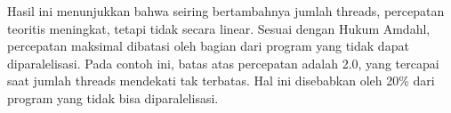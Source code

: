Hasil ini menunjukkan bahwa seiring bertambahnya jumlah threads, percepatan teoritis meningkat, tetapi tidak secara linear. Sesuai dengan Hukum Amdahl, percepatan maksimal dibatasi oleh bagian dari program yang tidak dapat diparalelisasi. Pada contoh ini, batas atas percepatan adalah 2.0, yang tercapai saat jumlah threads mendekati tak terbatas. Hal ini disebabkan oleh 20\% dari program yang tidak bisa diparalelisasi.